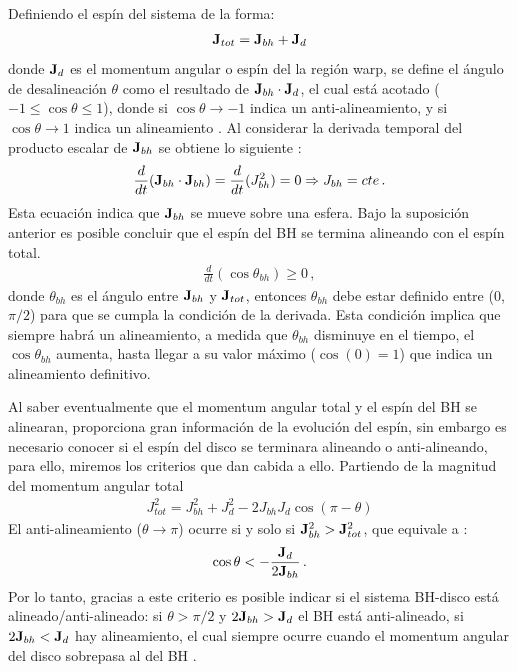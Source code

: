 Definiendo el espín del sistema de la forma:
\begin{align}
	{\bf{J}}_{tot}= {\bf{J}}_{bh}+{\bf{J}}_{d}
\end{align}
donde ${\bf{J}}_{d}$ es el momentum angular o espín del la región warp, se define el ángulo de desalineación $\theta$ como el resultado de  ${\bf{J}}_{bh}\cdot{\bf{J}}_{d}$, el cual está acotado ($-1\leq \cos\theta \leq 1$), donde si $\cos \theta \to -1$ indica un anti-alineamiento, y si $\cos \theta \to 1$ indica un alineamiento \cite{king2005}. Al considerar la derivada temporal del producto escalar de  ${\bf{J}}_{bh}$ se obtiene lo siguiente \cite{king2005}:
%
\begin{align}
    \frac{d }{dt}({\bf{J}}_{bh}\cdot {\bf{J}}_{bh})=  \frac{d}{dt}(J_{bh}^{2})= 0 \Rightarrow J_{bh}=cte\,.
\end{align}
%
Esta ecuación indica que ${\bf{J}}_{bh}$ se mueve sobre una esfera. Bajo la suposición anterior es posible concluir que el espín del BH se termina alineando con el espín total. 
%
\begin{align}
    \frac{d}{dt}(\cos\theta_{bh})\geq 0\,,
\end{align}
%
donde $\theta_{bh}$ es el ángulo entre ${\bf{J}}_{bh}$ y ${\bf{J}}_{tot}$, entonces $\theta_{bh}$ debe estar definido entre (0,$\pi/2$) para que se cumpla la condición de la derivada. Esta condición implica que siempre habrá un alineamiento, a medida que $\theta_{bh}$ disminuye en el tiempo, el $\cos\theta_{bh}$ aumenta, hasta llegar a su valor máximo ($\cos( 0)=1$) que indica un alineamiento definitivo.%

Al saber eventualmente que el momentum angular total y el espín del BH se alinearan, proporciona gran información de la evolución del espín, sin embargo es necesario conocer si el espín del disco se terminara alineando o anti-alineando, para ello, miremos los criterios que dan cabida a ello. Partiendo de la magnitud del momentum angular total
%
\begin{align}
    J^{2}_{tot} = J^{2}_{bh}+J_{d}^{2} -2J_{bh}J_{d}\cos(\pi -\theta)
\end{align}
%
El anti-alineamiento ($\theta\to\pi$) ocurre si y solo si ${\bf{J}}_{bh}^{2}>{\bf{J}}_{tot}^{2}$, que equivale a \cite{king2005}:
%
\begin{align}
    \cos\theta < - \frac{{\bf{J}}_{d}}{2{\bf{J}}_{bh}}\,.   
\end{align}
%
Por lo tanto, gracias a este criterio es posible indicar si el sistema BH-disco está alineado/anti-alineado: si $\theta >\pi/2$ y $2{\bf{J}}_{bh}>{\bf{J}}_{d}$ el BH está anti-alineado, si  $2{\bf{J}}_{bh}<{\bf{J}}_{d}$ hay alineamiento, el cual siempre ocurre cuando el momentum angular del disco sobrepasa al del BH \cite{king2005}.

